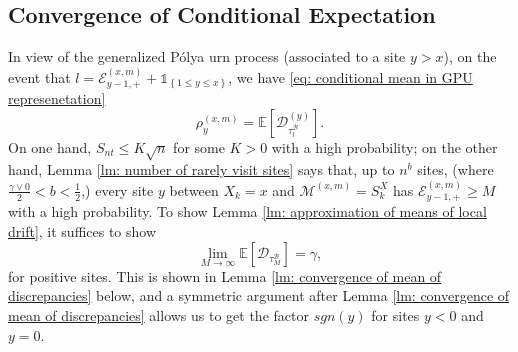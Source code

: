 \documentclass[EJP]{ejpecp} %
\begin{document}
\subsection{Convergence of Conditional Expectation}
\label{sec:RhoGamma}
In view of the generalized P\'{o}lya urn process (associated to a site $y> x$), 
on the event that $l = \mathcal{E}^{(x,m)}_{y-1,+} +\mathbb{1}_{\left\{1\leq y\leq x\right\}}$, we have \eqref{eq: conditional mean in GPU represenetation} 
$$\rho^{(x,m)}_y = \mathbb{E}\left[\mathscr{D}_{\tau_l^{\mathscr{B}}}^{(y)}\right].$$ 
On one hand, $S_{nt} \leq K\sqrt{n} $ for some $K>0$ with a high probability; on the other hand, Lemma \ref{lm: number of rarely visit sites} says that, up to $n^b$ sites, (where $\frac{\gamma \vee 0}{2}<b<\frac{1}{2}$,) every site $y$ between $X_k=x$ and $\mathcal{M}^{(x,m)} =S_{k}^X$ has $ \mathcal{E}^{(x,m)}_{y-1,+} \geq M $ with a high probability. To show Lemma \ref{lm: approximation of means of local drift}, it suffices to show 
\begin{equation}\label{eq: convergence of conditional expectation}
	\lim_{M\to\infty} \mathbb{E}[\mathscr{D}_{\tau_M^{\mathscr{B}}}] = \gamma , 
\end{equation} for positive sites. This is shown in Lemma \ref{lm: convergence of mean of discrepancies} below, and a symmetric argument after Lemma \ref{lm: convergence of mean of discrepancies} allows us to get the factor $sgn(y)$ for sites $y<0$ and $y=0$.
\end{document}
